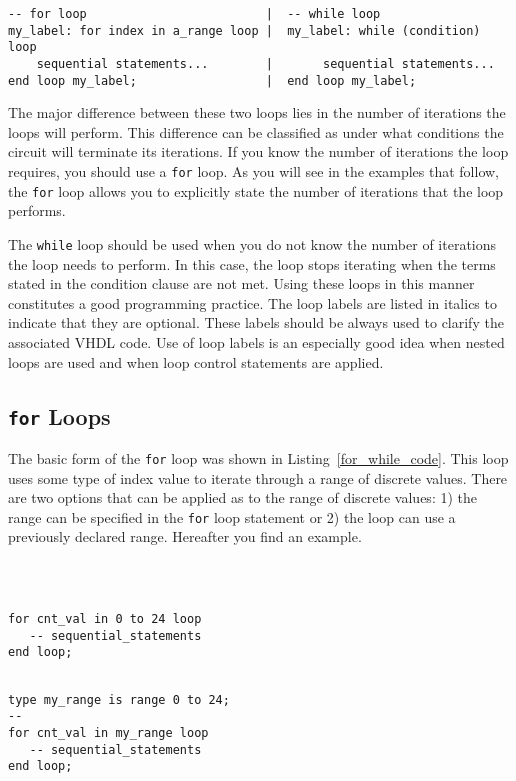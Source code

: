 \noindent
\begin{minipage}{0.99\linewidth}
\begin{lstlisting}[label=for_while_code, caption=The basic structure of the \texttt{for} and \texttt{while} loops.]
-- for loop							|  -- while loop
my_label: for index in a_range loop	|  my_label: while (condition) loop
	sequential statements...		|       sequential statements...
end loop my_label;					|  end loop my_label;
\end{lstlisting}
\end{minipage}

The major difference between these two loops lies in the number of iterations the loops will perform. This difference can be classified as under what conditions the circuit will terminate its iterations. If you know the number of iterations the loop requires, you should use a \texttt{for} loop. As you will see in the examples that follow, the \texttt{for} loop allows you to explicitly state the number of iterations that the loop performs.

The \texttt{while} loop should be used when you do not know the number of iterations the loop needs to perform. In this case, the loop stops iterating when the terms stated in the condition clause are not met. Using these loops in this manner constitutes a good programming practice. The loop labels are listed in italics to indicate that they are optional. These labels should be always used to clarify the associated VHDL code. Use of loop labels is an especially good idea when nested loops are used and when loop control statements are applied.

\subsection{\texttt{for} Loops}
The basic form of the \texttt{for} loop was shown in Listing~\ref{for_while_code}. This loop uses some type of index value to iterate through a range of discrete values. There are two options that can be applied as to the range of discrete values: 1) the range can be specified in the \texttt{for} loop statement or 2) the loop can use a previously declared range. Hereafter you find  an example.

\vspace{10pt}
\noindent
\begin{minipage}{0.49\linewidth}
\begin{lstlisting}



for cnt_val in 0 to 24 loop
   -- sequential_statements
end loop;
\end{lstlisting}
\end{minipage}
\begin{minipage}{0.5\linewidth}
\begin{lstlisting}

type my_range is range 0 to 24;
--
for cnt_val in my_range loop
   -- sequential_statements
end loop;
\end{lstlisting}
\end{minipage}


